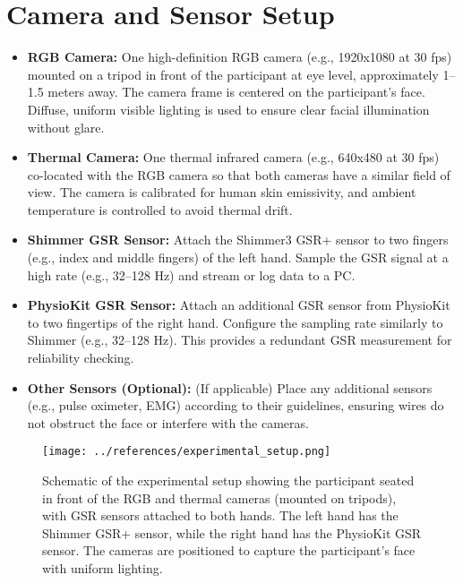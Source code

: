 \documentclass{article}
\begin{document}
\section{Camera and Sensor Setup}
\begin{itemize}
    \item \textbf{RGB Camera:} One high-definition RGB camera (e.g., 1920x1080 at 30 fps) mounted on a tripod in front of the participant at eye level, approximately 1–1.5 meters away. The camera frame is centered on the participant’s face. Diffuse, uniform visible lighting is used to ensure clear facial illumination without glare.
    \item \textbf{Thermal Camera:} One thermal infrared camera (e.g., 640x480 at 30 fps) co-located with the RGB camera so that both cameras have a similar field of view. The camera is calibrated for human skin emissivity, and ambient temperature is controlled to avoid thermal drift.
    \item \textbf{Shimmer GSR Sensor:} Attach the Shimmer3 GSR+ sensor to two fingers (e.g., index and middle fingers) of the left hand. Sample the GSR signal at a high rate (e.g., 32–128 Hz) and stream or log data to a PC.
    \item \textbf{PhysioKit GSR Sensor:} Attach an additional GSR sensor from PhysioKit to two fingertips of the right hand. Configure the sampling rate similarly to Shimmer (e.g., 32–128 Hz). This provides a redundant GSR measurement for reliability checking.
    \item \textbf{Other Sensors (Optional):} (If applicable) Place any additional sensors (e.g., pulse oximeter, EMG) according to their guidelines, ensuring wires do not obstruct the face or interfere with the cameras.
\end{itemize}

\begin{figure}[h]
    \centering
    \texttt{[image: ../references/experimental\_setup.png]}
    \caption{Schematic of the experimental setup showing the participant seated in front of the RGB and thermal cameras (mounted on tripods), with GSR sensors attached to both hands. The left hand has the Shimmer GSR+ sensor, while the right hand has the PhysioKit GSR sensor. The cameras are positioned to capture the participant's face with uniform lighting.}
\end{figure}
\end{document}
